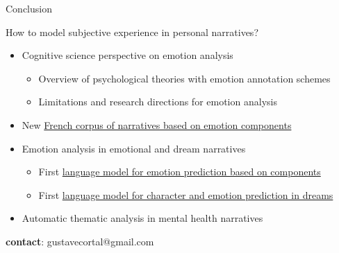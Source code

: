 \documentclass[handout,10pt]{beamer}
\begin{document}
\begin{frame}{Conclusion}

How to model subjective experience in personal narratives?

\vspace{0.5cm}
\pause


\begin{itemize}[<+->]
  \setlength{\itemsep}{1.0em}
  \item Cognitive science perspective on emotion analysis
  \begin{itemize}[<+->]\footnotesize
    \setlength{\itemsep}{0.5em}
    \item Overview of psychological theories with emotion annotation schemes
    \item Limitations and research directions for emotion analysis
  \end{itemize}
  \item New \href{https://huggingface.co/datasets/gustavecortal/FrenchEmotionalNarratives}{French corpus of narratives based on emotion components}
  \item Emotion analysis in emotional and dream narratives 
  \begin{itemize}[<+->]\footnotesize
    \setlength{\itemsep}{0.5em}
    \item First \href{https://huggingface.co/gustavecortal/distilcamembert-cae-all}{language model for emotion prediction based on components}
    \item First \href{https://huggingface.co/gustavecortal/dream-t5}{language model for character and emotion prediction in dreams}
  \end{itemize}
  \item Automatic thematic analysis in mental health narratives
\end{itemize}

\vspace{0.25cm}

\begin{center}
  \textbf{contact}: gustavecortal@gmail.com
\end{center}


\end{frame}
\end{document}
